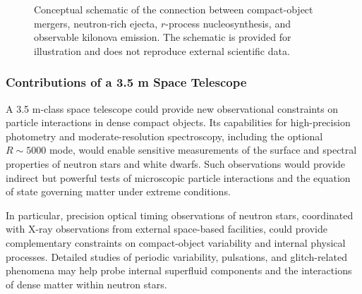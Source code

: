 \begin{figure}[htbp]
  \centering
  \caption{Conceptual schematic of the connection between compact-object mergers,
  neutron-rich ejecta, $r$-process nucleosynthesis, and observable kilonova emission.
  The schematic is provided for illustration and does not reproduce external scientific data.}
  \label{fig:compact-object-nucleosynthesis}
\end{figure}

\subsubsection{Contributions of a 3.5 m Space Telescope}

A 3.5 m-class space telescope could provide new observational constraints on particle interactions in dense compact objects. Its capabilities for high-precision photometry and moderate-resolution spectroscopy, including the optional $R \sim 5000$ mode, would enable sensitive measurements of the surface and spectral properties of neutron stars and white dwarfs. Such observations would provide indirect but powerful tests of microscopic particle interactions and the equation of state governing matter under extreme conditions.

In particular, precision optical timing observations of neutron stars, coordinated with X-ray observations from external space-based facilities, could provide complementary constraints on compact-object variability and internal physical processes. Detailed studies of periodic variability, pulsations, and glitch-related phenomena may help probe internal superfluid components and the interactions of dense matter within neutron stars.

